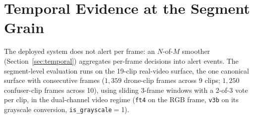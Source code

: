 \section{Temporal Evidence at the Segment Grain}
\label{sec:temporal_results}

The deployed system does not alert per frame: an $N$-of-$M$ smoother (Section~\ref{sec:temporal}) aggregates per-frame decisions into alert events. The segment-level evaluation runs on the 19-clip real-video surface, the one canonical surface with consecutive frames ($1{,}359$ drone-clip frames across 9 clips; $1{,}250$ confuser-clip frames across 10), using sliding 3-frame windows with a 2-of-3 vote per clip, in the dual-channel video regime (\texttt{ft4} on the RGB frame, \texttt{v3b} on its grayscale conversion, \texttt{is\_grayscale}$=$1).

